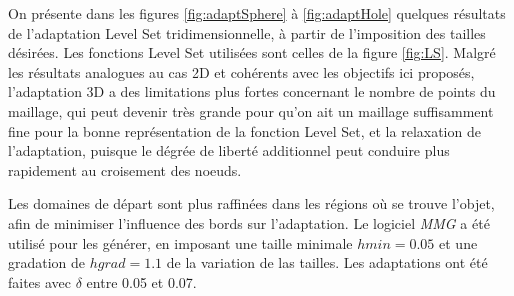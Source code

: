 \indent On présente dans les figures \ref{fig:adaptSphere} à \ref{fig:adaptHole} quelques résultats de l'adaptation Level Set tridimensionnelle, à partir de l'imposition des tailles désirées. Les fonctions Level Set utilisées sont celles de la figure \ref{fig:LS}. Malgré les résultats analogues au cas 2D et cohérents avec les objectifs ici proposés, l'adaptation 3D a des limitations plus fortes concernant le nombre de points du maillage, qui peut devenir très grande pour qu'on ait un maillage suffisamment fine pour la bonne représentation de la fonction Level Set, et la relaxation de l'adaptation, puisque le dégrée de liberté additionnel peut conduire plus rapidement au croisement des noeuds.

\indent Les domaines de départ sont plus raffinées dans les régions où se trouve l'objet, afin de minimiser l'influence des bords sur l'adaptation. Le logiciel \emph{MMG} a été utilisé pour les générer, en imposant une taille minimale \(hmin =  0.05\) et une gradation de \(hgrad = 1.1\) de la variation de las tailles. Les adaptations ont été faites avec \(\delta\) entre 0.05 et 0.07.

